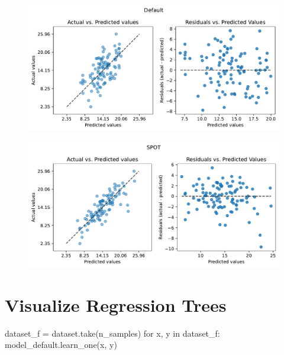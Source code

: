 \documentclass[
  letterpaper,
  DIV=11,
  numbers=noendperiod]{scrreprt}
\newenvironment{Shaded}{\begin{snugshade}}{\end{snugshade}}
\newcommand{\ControlFlowTok}[1]{\textcolor[rgb]{0.00,0.23,0.31}{#1}}
\newcommand{\KeywordTok}[1]{\textcolor[rgb]{0.00,0.23,0.31}{#1}}
\newcommand{\NormalTok}[1]{\textcolor[rgb]{0.00,0.23,0.31}{#1}}
\newcommand{\OperatorTok}[1]{\textcolor[rgb]{0.37,0.37,0.37}{#1}}
\begin{document}
\begin{figure}[H]

{\centering \includegraphics{13_spot_hpt_river_files/figure-pdf/cell-36-output-1.pdf}

}

\end{figure}

\begin{figure}[H]

{\centering \includegraphics{13_spot_hpt_river_files/figure-pdf/cell-36-output-2.pdf}

}

\end{figure}

\hypertarget{visualize-regression-trees}{%
\section{Visualize Regression Trees}\label{visualize-regression-trees}}

\begin{Shaded}
\begin{Highlighting}[]
\NormalTok{dataset\_f }\OperatorTok{=}\NormalTok{ dataset.take(n\_samples)}
\ControlFlowTok{for}\NormalTok{ x, y }\KeywordTok{in}\NormalTok{ dataset\_f:}
\NormalTok{    model\_default.learn\_one(x, y)}
\end{Highlighting}
\end{Shaded}
\end{document}
